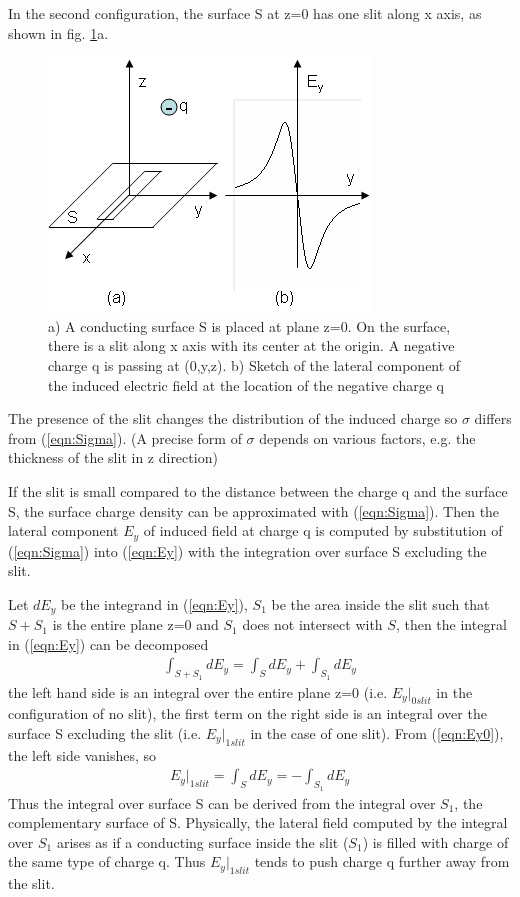 \documentclass[prd,showpacs,twocolumn]{revtex4-1}
\begin{document}
In the second configuration, the surface S at z=0 has one slit along x axis, as shown in fig. \ref{fig:Single_Slit}a.
\begin{figure}
\center
\includegraphics{1slit.png}
\caption{a) A conducting surface S is placed at plane z=0. On the surface, there is a slit along x axis with its center at the origin. A negative charge q is passing at (0,y,z). b) Sketch of the lateral component of the induced electric field at the location of the negative charge q}
\label{fig:Single_Slit}
\end{figure}
The presence of the slit changes the distribution of the induced charge so $\sigma$ differs from (\ref{eqn:Sigma}). (A precise form of $\sigma$ depends on various factors, e.g. the thickness of the slit in z direction)

If the slit is small compared to the distance between the charge q and the surface S, the surface charge density can be approximated with (\ref{eqn:Sigma}). Then the lateral component $E_y$ of induced field at charge q is computed by substitution of (\ref{eqn:Sigma}) into (\ref{eqn:Ey}) with the integration over surface S excluding the slit.

Let $dE_y$ be the integrand in (\ref{eqn:Ey}), $S_1$ be the area inside the slit such that $S+S_1$ is the entire plane z=0 and $S_1$ does not intersect with $S$, then the integral in (\ref{eqn:Ey}) can be decomposed
\begin{eqnarray}
\int_{S+S_1} dE_y=\int_{S} dE_y+\int_{S_1} dE_y
\label{eqn:Ey0_1}
\end{eqnarray}
the left hand side is an integral over the entire plane z=0 (i.e. $E_y|_{0slit}$ in the configuration of no slit), the first term on the right side is an integral over the surface S excluding the slit (i.e. $E_y|_{1slit}$ in the case of one slit). From (\ref{eqn:Ey0}), the left side vanishes, so
\begin{eqnarray}
E_y|_{1slit}=\int_{S} dE_y=-\int_{S_1} dE_y
\label{eqn:Ey1}
\end{eqnarray}
Thus the integral over surface S can be derived from the integral over $S_1$, the complementary surface of S. Physically, the lateral field computed by the integral over $S_1$ arises as if a conducting surface inside the slit ($S_1$) is filled with charge of the same type of charge q. Thus $E_y|_{1slit}$ tends to push charge q further away from the slit.
\end{document}
